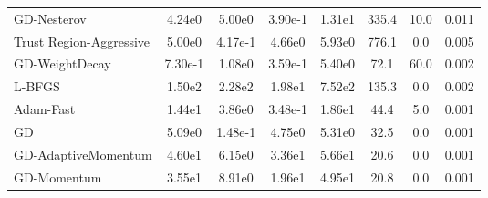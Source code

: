 \begin{table}[htbp]
{\begin{tabular}{p{2.5cm}*{7}{c}}
GD-Nesterov & 4.24e0 & 5.00e0 & 3.90e-1 & 1.31e1 & 335.4 & 10.0 & 0.011 \\
Trust Region-Aggressive & 5.00e0 & 4.17e-1 & 4.66e0 & 5.93e0 & 776.1 & 0.0 & 0.005 \\
GD-WeightDecay & 7.30e-1 & 1.08e0 & 3.59e-1 & 5.40e0 & 72.1 & 60.0 & 0.002 \\
L-BFGS & 1.50e2 & 2.28e2 & 1.98e1 & 7.52e2 & 135.3 & 0.0 & 0.002 \\
Adam-Fast & 1.44e1 & 3.86e0 & 3.48e-1 & 1.86e1 & 44.4 & 5.0 & 0.001 \\
GD & 5.09e0 & 1.48e-1 & 4.75e0 & 5.31e0 & 32.5 & 0.0 & 0.001 \\
GD-AdaptiveMomentum & 4.60e1 & 6.15e0 & 3.36e1 & 5.66e1 & 20.6 & 0.0 & 0.001 \\
GD-Momentum & 3.55e1 & 8.91e0 & 1.96e1 & 4.95e1 & 20.8 & 0.0 & 0.001 \\
\bottomrule
\end{tabular}
}
\end{table}
